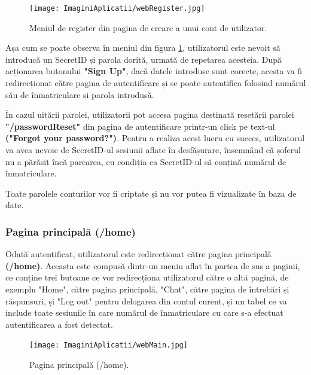 \documentclass[12pt]{article}
\begin{document}
\begin{figure}[H]
  \centering
  \texttt{[image: ImaginiAplicatii/webRegister.jpg]}
  \caption{Meniul de register din pagina de creare a unui cont de utilizator.}
  \label{fig:aplicatie_register_page}
\end{figure}

Așa cum se poate observa \^{i}n meniul din figura \ref{fig:aplicatie_register_page}, utilizatorul este nevoit s\u{a} introduc\u{a} un SecretID și parola dorit\u{a}, urmat\u{a} de repetarea acesteia. Dup\u{a} acționarea butonului \textbf{"Sign Up"}, dac\u{a} datele introduse sunt corecte, acesta va fi redirecționat c\u{a}tre pagina de autentificare și se poate autentifica folosind num\u{a}rul s\u{a}u de \^{i}nmatriculare și parola introdus\u{a}.

\^{I}n cazul uit\u{a}rii parolei, utilizatorii pot accesa pagina destinat\u{a} reset\u{a}rii parolei \textbf{"/passwordReset"} din pagina de autentificare printr-un click pe text-ul \textbf{("Forgot your password?")}. Pentru a realiza acest lucru cu succes, utilizatorul va avea nevoie de SecretID-ul sesiunii aflate \^{i}n desf\u{a}șurare, \^{i}nsemn\^{a}nd c\u{a} șoferul nu a p\u{a}r\u{a}sit \^{i}nc\u{a} parcarea, cu condiția ca SecretID-ul s\u{a} conțin\u{a} num\u{a}rul de \^{i}nmatriculare.

Toate parolele conturilor vor fi criptate și nu vor putea fi vizualizate \^{i}n baza de date.

\subsubsection{Pagina principal\u{a} (/home)}

Odat\u{a} autentificat, utilizatorul este redirecționat c\u{a}tre pagina principal\u{a} \textbf{(/home)}. Aceasta este compus\u{a} dintr-un meniu aflat \^{i}n partea de sus a paginii, ce conține trei butoane ce vor redirecționa utilizatorul c\u{a}tre o alt\u{a} pagin\u{a}, de exemplu "Home", c\u{a}tre pagina principal\u{a}, "Chat", c\u{a}tre pagina de \^{i}ntreb\u{a}ri și r\u{a}spunsuri, și "Log out" pentru delogarea din contul curent, și un tabel ce va include toate sesiunile \^{i}n care num\u{a}rul de \^{i}nmatriculare cu care s-a efectuat autentificarea a fost detectat. 

\begin{figure}[H]
  \centering
  \texttt{[image: ImaginiAplicatii/webMain.jpg]}
  \caption{Pagina principal\u{a} (/home).}
  \label{fig:aplicatie_pagina_principala}
\end{figure}
\end{document}
